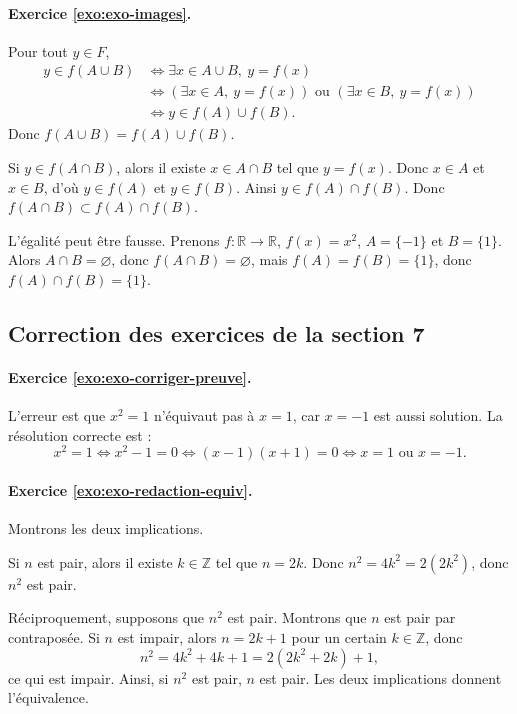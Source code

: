\documentclass[11pt,a4paper]{article}
\newcommand{\R}{\mathbb{R}}
\newcommand{\Z}{\mathbb{Z}}
\begin{document}
\paragraph{Exercice \ref{exo:exo-images}.}
Pour tout $y\in F$,
\begin{align*}
y\in f(A\cup B)
&\Longleftrightarrow \exists x\in A\cup B,\ y=f(x)\\
&\Longleftrightarrow (\exists x\in A,\ y=f(x))\text{ ou }(\exists x\in B,\ y=f(x))\\
&\Longleftrightarrow y\in f(A)\cup f(B).
\end{align*}
Donc $f(A\cup B)=f(A)\cup f(B)$.

Si $y\in f(A\cap B)$, alors il existe $x\in A\cap B$ tel que $y=f(x)$. Donc $x\in A$ et $x\in B$, d'où $y\in f(A)$ et $y\in f(B)$. Ainsi $y\in f(A)\cap f(B)$. Donc $f(A\cap B)\subset f(A)\cap f(B)$.

L'égalité peut être fausse. Prenons $f:\R\to\R$, $f(x)=x^2$, $A=\{-1\}$ et $B=\{1\}$. Alors $A\cap B=\varnothing$, donc $f(A\cap B)=\varnothing$, mais $f(A)=f(B)=\{1\}$, donc $f(A)\cap f(B)=\{1\}$.

\subsection*{Correction des exercices de la section 7}

\paragraph{Exercice \ref{exo:exo-corriger-preuve}.}
L'erreur est que $x^2=1$ n'équivaut pas à $x=1$, car $x=-1$ est aussi solution. La résolution correcte est :
\[
x^2=1 \Longleftrightarrow x^2-1=0 \Longleftrightarrow (x-1)(x+1)=0 \Longleftrightarrow x=1\text{ ou }x=-1.
\]

\paragraph{Exercice \ref{exo:exo-redaction-equiv}.}
Montrons les deux implications.

Si $n$ est pair, alors il existe $k\in\Z$ tel que $n=2k$. Donc $n^2=4k^2=2(2k^2)$, donc $n^2$ est pair.

Réciproquement, supposons que $n^2$ est pair. Montrons que $n$ est pair par contraposée. Si $n$ est impair, alors $n=2k+1$ pour un certain $k\in\Z$, donc
\[
n^2=4k^2+4k+1=2(2k^2+2k)+1,
\]
ce qui est impair. Ainsi, si $n^2$ est pair, $n$ est pair. Les deux implications donnent l'équivalence.
\end{document}
